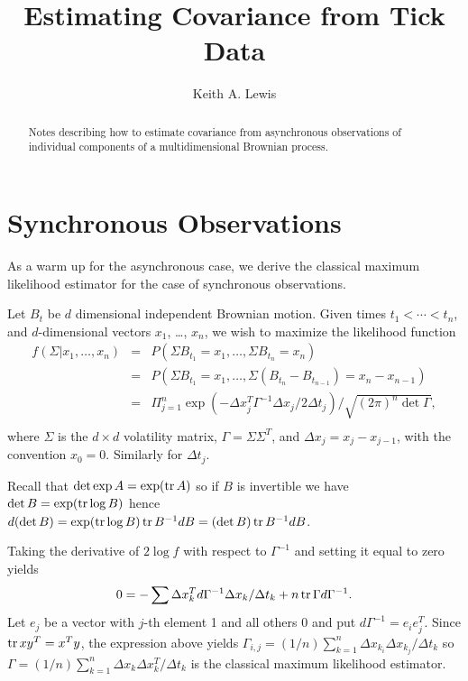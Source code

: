 \documentclass[11pt,fleqn]{article}
\def\tr{\qopname\relax n{tr}}
\begin{document}
\title{Estimating Covariance from Tick Data}
\author{Keith A. Lewis}
\maketitle

\begin{abstract}
Notes describing how to estimate covariance from asynchronous
observations of individual components of a multidimensional
Brownian process.
\end{abstract}

\section{Synchronous Observations}
As a warm up for the asynchronous case, we derive the classical
maximum likelihood estimator for the case of synchronous observations.

Let $B_t$ be $d$ dimensional independent Brownian motion.
Given times $t_1 < \cdots < t_n$, and $d$-dimensional vectors $x_1$,
\dots, $x_n$,
we wish to maximize the likelihood function
\begin{eqnarray*}
f(\Sigma|x_1,\dots,x_n) &=& P(\Sigma B_{t_1} = x_1, \dots,
    \Sigma B_{t_n} = x_n)\\
    &=& P(\Sigma B_{t_1} = x_1, \dots,
        \Sigma(B_{t_n} - B_{t_{n-1}}) = x_n - x_{n-1})\\
    &=& \Pi_{j = 1}^n \exp(-\Delta x_j^T \Gamma^{-1}\Delta x_j/2\Delta t_j)
            /\sqrt{(2\pi)^n\det\Gamma},\\
\end{eqnarray*}
where $\Sigma$ is the $d\times d$ volatility matrix,
$\Gamma = \Sigma\Sigma^T$,
and $\Delta x_j = x_j - x_{j - 1}$, with the convention $x_0 = 0$.
Similarly for $\Delta t_j$.

Recall that $\det\exp A = \exp(\tr A)$ so if $B$ is invertible
we have $\det B = \exp(\tr\log B)$ hence $d(\det B) = \exp(\tr\log B)
\tr B^{-1}dB = (\det B) \tr B^{-1}dB$.

Taking the derivative of $2\log f$ with respect to $\Gamma^{-1}$
and setting it equal to zero yields
\begin{equation*}
    0 = -\sum \Delta x_k^T d\Gamma^{-1}\Delta x_k/\Delta t_k
        + n\tr \Gamma d\Gamma^{-1}.
\end{equation*}
Let $e_j$ be a vector with $j$-th element 1 and all others 0 and put
$d\Gamma^{-1} = e_ie_j^T$. Since $\tr xy^T = x^Ty$, the expression
above yields $\Gamma_{i,j} = (1/n)\sum_{k = 1}^n \Delta x_{k_i} \Delta
x_{k_j}/\Delta t_k$ so $\Gamma = (1/n)\sum_{k=1}^n \Delta x_k \Delta
x_k^T/\Delta t_k$ is the classical maximum likelihood estimator.
\end{document}

